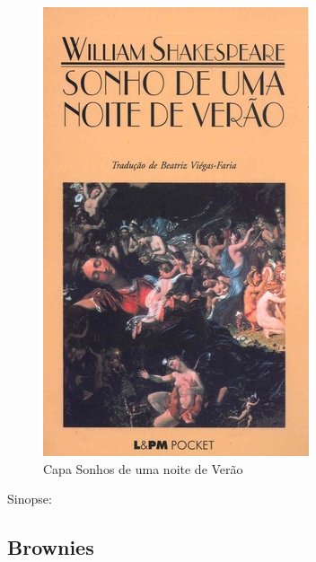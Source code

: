 \begin{figure}[htb]
	\caption{\label{sonhos_shakespeare} Capa Sonhos de uma noite de Verão}
	\begin{center}
	    \includegraphics[width=\textwidth/2]{imagens/Sonhos.jpg}
	\end{center}
\end{figure}


Sinopse:

\clearpage

\subsection{Brownies}

